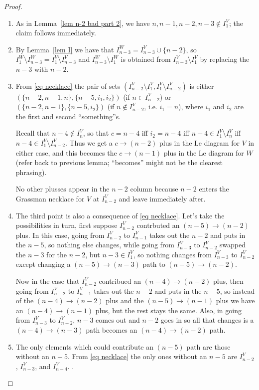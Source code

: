 \documentclass[11pt]{article}
\newcommand{\note}{\todo[color=green!40]}
\theoremstyle{remark}
\theoremstyle{definition}
\begin{document}
\begin{proof}
\begin{enumerate}  

\item As in Lemma~\ref{lem n-2 bad part 2}, we have $n,n-1,n-2,n-3 \not\in I_1^V$; the claim follows immediately.

\item By Lemma~\ref{lem I} we have that $I_{n-3}^W = I_{n-3}^V \cup \{n-2\}$, so $I_{1}^W \setminus I_{n-3}^W = I_1^V \setminus I_{n-3}^V$ and $I_{n-3}^W \setminus I_1^W$ is obtained from $I_{n-3}^V \setminus I_{1}^V$ by replacing the $n-3$ with $n-2$.    

\item From \eqref{eq necklace} the pair of sets $(I_{n-2}^V\setminus I_1^V, I_1^V\setminus I_{n-2}^V)$ is either $(\{n-2, n-1, n\}, \{n-5, i_1, i_2\})$ (if $n \in I_{n-2}^V$) or $(\{n-2, n-1\}, \{n-5, i_2\})$ (if $n \not\in I_{n-2}^V$, i.e. $i_1 = n$), where $i_1$ and $i_2$ are the first and second ``something''s. 

Recall that $n-4 \not\in I_n^V$, so that $c = n-4$ iff $i_2 = n-4$ iff $n-4 \in I_1^V\setminus I_n^V$ iff $n-4 \in I_1^V \setminus I_{n-2}^V$. Thus we get a $c \rightarrow (n-2)$ plus in the Le diagram for $V$ in either case, and this becomes the $c \rightarrow (n-1)$ plus in the Le diagram for $W$ (refer back to previous lemma; ``becomes'' might not be the clearest phrasing).

No other plusses appear in the $n-2$ column because $n-2$ enters the Grassman necklace for $V$ at $I_{n-2}^V$ and leave immediately after.
  \item 
    The third point is also a consequence of \eqref{eq necklace}.  Let's take the possibilities in turn, first suppose $I_{n-2}^V$ contrbuted an $(n-5)\rightarrow (n-2)$ plus.  In this case, going from $I_{n-2}^V$ to $I_{n-1}^V$ takes out the $n-2$ and puts in the $n-5$, so  nothing else changes, while going from $I_{n-3}^V$ to $I_{n-2}^V$ swapped the $n-3$ for the $n-2$, but $n-3\in I_1^V$, so nothing changes from $I_{n-3}^V$ to $I_{n-2}^V$ except changing a $(n-5)\rightarrow (n-3)$ path to $(n-5)\rightarrow (n-2)$.

  Now in the case that $I_{n-2}^V$ contribued an $(n-4)\rightarrow (n-2)$ plus, then going from $I_{n-2}^V$ to $I_{n-1}^V$ takes out the $n-2$ and puts in the $n-5$, so instead of the $(n-4)\rightarrow (n-2)$ plus and the $(n-5)\rightarrow (n-1)$ plus we have an $(n-4)\rightarrow (n-1)$ plus, but the rest stays the same.  Also, in going from $I_{n-3}^V$ to $I_{n-2}^V$, $n-3$ comes out and $n-2$ goes in so all that changes is a $(n-4)\rightarrow (n-3)$ path becomes an $(n-4)\rightarrow (n-2)$ path.
\item The only elements which could contribute an $(n-5)$ path are those without an $n-5$.  From \eqref{eq necklace} the only ones without an $n-5$ are $I_{n-2}^V$, $I_{n-3}^V$, and $I_{n-4}^V$.  \note{find the right pluss or lack thereof}.
  \end{enumerate}
\end{proof}
\end{document}
